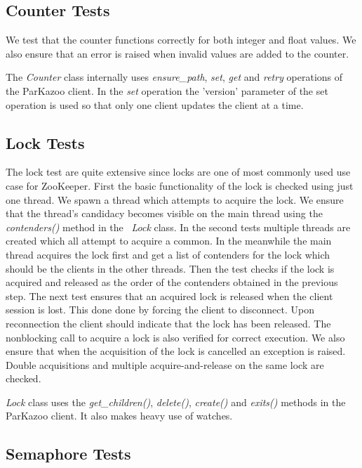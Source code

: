 \subsection{Counter Tests}

We test that the counter functions correctly for both integer and float values. We also ensure that an error is raised when invalid values are added to the counter.

The \textit{Counter} class internally uses \textit{ensure\_path}, \textit{set}, \textit{get} and \textit{retry} operations of the ParKazoo client. In the \textit{set} operation the 'version' parameter of the set operation is used so that only one client updates the client at a time.

\subsection{Lock Tests}
The lock test are quite extensive since locks are one of most commonly used use case for ZooKeeper. First the basic functionality of the lock is checked using just one thread. We spawn a thread which attempts to acquire the lock. We ensure that the thread's candidacy becomes visible on the main thread using the \textit{contenders()} method in the ~\textit{Lock} class. In the second tests multiple threads are created which all attempt to acquire a common. In the meanwhile the main thread acquires the lock first and get a list of contenders for the lock which should be the clients in the other threads. Then the test checks if the lock is acquired and released as the order of the contenders obtained in the previous step. The next test ensures that an acquired lock is released when the client session is lost. This done done by forcing the client to disconnect. Upon reconnection the client should indicate that the lock has been released. The nonblocking call to acquire a lock is also verified for correct execution. We also ensure that when the acquisition of the lock is cancelled an exception is raised. Double acquisitions and multiple acquire-and-release on the same lock are checked.

\textit{Lock} class uses the \textit{get\_children()}, \textit{delete()}, \textit{create()} and \textit{exits()} methods in the ParKazoo client. It also makes heavy use of watches.

\subsection{Semaphore Tests}

